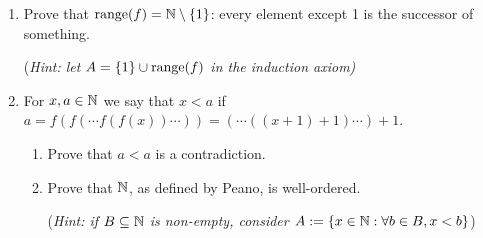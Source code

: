 \begin{exercises}
\begin{enumerate}
\begin{enumerate}
		\item Prove that $\operatorname{range}(f)=\mathbb{N}\setminus\{1\}$: every element except 1 is the successor of something.\par
		(\emph{Hint: let $A=\{1\}\cup\operatorname{range}(f)$ in the induction axiom)}
		
		
		\item For $x,a\in\mathbb{N}$ we say that $x<a$ if $a=f(f(\cdots f(f(x))\cdots)) =(\cdots((x+1)+1)\cdots)+1$.
		\begin{enumerate}
		  \item Prove that $a<a$ is a contradiction.
		  \item Prove that $\mathbb{N}$, as defined by Peano, is well-ordered.\par
			(\emph{Hint: if $B\subseteq\mathbb{N}$ is non-empty, consider $A:=\{x\in\mathbb{N}:\forall b\in B, x<b\}$})
		\end{enumerate}

	\end{enumerate}
	
	

\end{enumerate}
\end{exercises}
